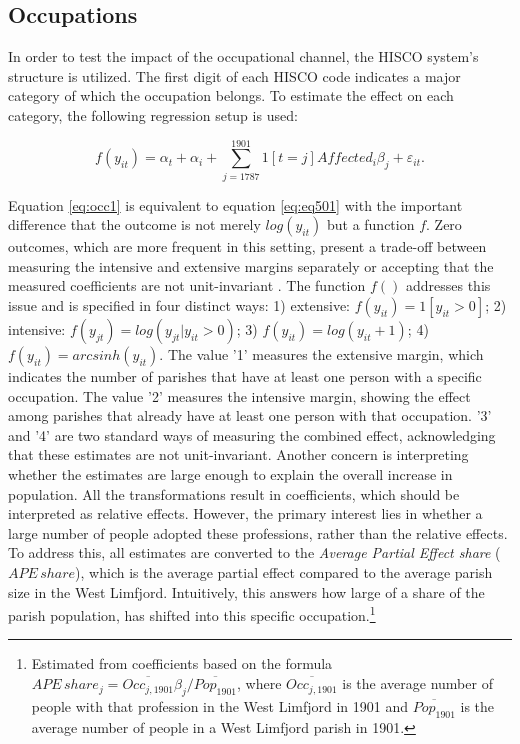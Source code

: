 \documentclass[11pt]{article}
\begin{document}
\subsection{Occupations}
In order to test the impact of the occupational channel, the HISCO system's structure is utilized. The first digit of each HISCO code indicates a major category of which the occupation belongs. To estimate the effect on each category, the following regression setup is used:

\begin{equation}
\label{eq:occ1}
f(y_{it})= \alpha_t + \alpha_i + \sum_{j=1787}^{1901} 1[t=j]Affected_{i}\beta_{j} + \varepsilon_{it}.
\end{equation}

Equation \ref{eq:occ1} is equivalent to equation \ref{eq:eq501} with the important difference that the outcome is not merely $log(y_{it})$ but a function $f$. Zero outcomes, which are more frequent in this setting, present a trade-off between measuring the intensive and extensive margins separately or accepting that the measured coefficients are not unit-invariant \citep{roth2023loglike}. The function $f()$ addresses this issue and is specified in four distinct ways: 1) extensive: $f(y_{it}) = 1[y_{it}>0]$; 2) intensive: $f(y_{jt}) = log(y_{jt}|y_{it}>0)$; 3) $f(y_{it}) = log(y_{it}+1)$; 4) $f(y_{it}) = arcsinh(y_{it})$. The value '1' measures the extensive margin, which indicates the number of parishes that have at least one person with a specific occupation. The value '2' measures the intensive margin, showing the effect among parishes that already have at least one person with that occupation. '3' and '4' are two standard ways of measuring the combined effect, acknowledging that these estimates are not unit-invariant. Another concern is interpreting whether the estimates are large enough to explain the overall increase in population. All the transformations result in coefficients, which should be interpreted as relative effects. However, the primary interest lies in whether a large number of people adopted these professions, rather than the relative effects. To address this, all estimates are converted to the \textit{Average Partial Effect share} ($APE\,share$), which is the average partial effect compared to the average parish size in the West Limfjord. Intuitively, this answers how large of a share of the parish population, has shifted into this specific occupation.\footnote{Estimated from coefficients based on the formula $APE\,share_j = \overline{Occ_{j, 1901}}\beta_j / \overline{Pop_{1901}}$, where $\overline{Occ_{j, 1901}}$ is the average number of people with that profession in the West Limfjord in 1901 and $\overline{Pop_{1901}}$ is the average number of people in a West Limfjord parish in 1901. } 
\end{document}
